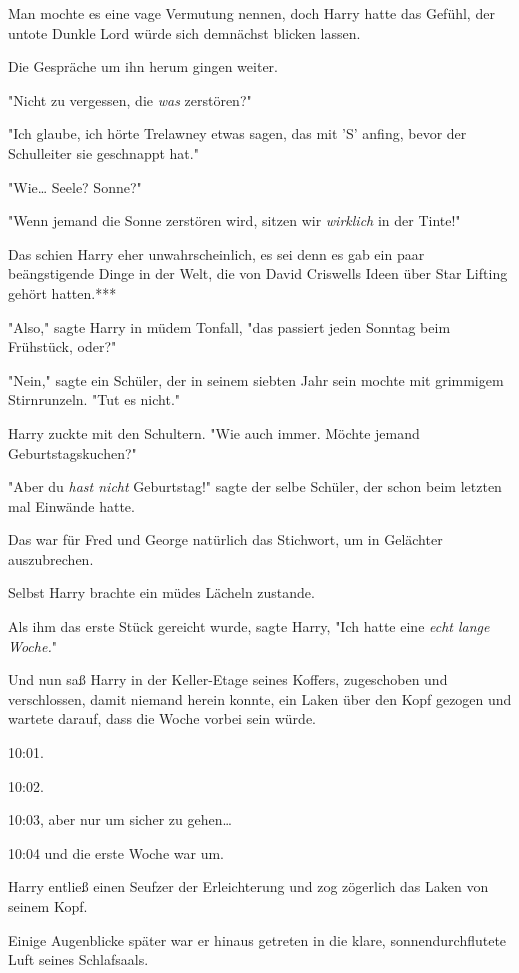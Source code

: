 {Man mochte es eine vage Vermutung nennen, doch Harry hatte das Gefühl, der untote Dunkle Lord würde sich demnächst blicken lassen.

Die Gespräche um ihn herum gingen weiter.

"Nicht zu vergessen, die \emph{was} zerstören?"

"Ich glaube, ich hörte Trelawney etwas sagen, das mit 'S' anfing, bevor der Schulleiter sie geschnappt hat."

"Wie… Seele? Sonne?"

"Wenn jemand die Sonne zerstören wird, sitzen wir \emph{wirklich} in der Tinte!"

Das schien Harry eher unwahrscheinlich, es sei denn es gab ein paar beängstigende Dinge in der Welt, die von David Criswells Ideen über Star Lifting gehört hatten.***

"Also," sagte Harry in müdem Tonfall, "das passiert jeden Sonntag beim Frühstück, oder?"

"Nein," sagte ein Schüler, der in seinem siebten Jahr sein mochte mit grimmigem Stirnrunzeln. "Tut es nicht."

Harry zuckte mit den Schultern. "Wie auch immer. Möchte jemand Geburtstagskuchen?"

"Aber du \emph{hast nicht} Geburtstag!" sagte der selbe Schüler, der schon beim letzten mal Einwände hatte.

Das war für Fred und George natürlich das Stichwort, um in Gelächter auszubrechen.

Selbst Harry brachte ein müdes Lächeln zustande.

Als ihm das erste Stück gereicht wurde, sagte Harry, "Ich hatte eine \emph{echt lange Woche.}"

\later

Und nun saß Harry in der Keller-Etage seines Koffers, zugeschoben und verschlossen, damit niemand herein konnte, ein Laken über den Kopf gezogen und wartete darauf, dass die Woche vorbei sein würde.

10:01.

10:02.

10:03, aber nur um sicher zu gehen…

10:04 und die erste Woche war um.

Harry entließ einen Seufzer der Erleichterung und zog zögerlich das Laken von seinem Kopf.

Einige Augenblicke später war er hinaus getreten in die klare, sonnendurchflutete Luft seines Schlafsaals.

}

